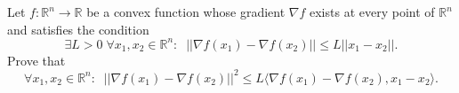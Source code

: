 Let \(f\colon \mathbb{R}^{n}\to \mathbb{R}\) be a convex function whose gradient \(\nabla f\)
exists at every point of \(\mathbb{R}^{n}\) and satisfies the condition
\[\exists L>0\; \forall x_{1},x_{2}\in \mathbb{R}^{n}:\;\; ||\nabla f(x_{1})-\nabla f(x_{2})||\leq L||x_{1}-x_{2}||.\]Prove that
\[ \forall x_{1},x_{2}\in \mathbb{R}^{n}:\;\; ||\nabla f(x_{1})-\nabla f(x_{2})||^{2}\leq L\langle\nabla f(x_{1})-\nabla f(x_{2}), x_{1}-x_{2}\rangle. \]